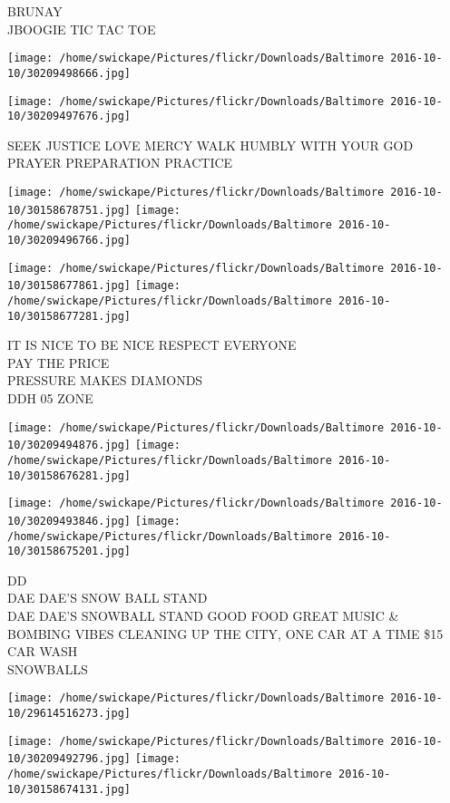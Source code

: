 \documentclass[10pt,letterpaper]{article}
\begin{document}
BRUNAY\\
JBOOGIE TIC TAC TOE
\pagebreak

\texttt{[image: /home/swickape/Pictures/flickr/Downloads/Baltimore 2016-10-10/30209498666.jpg]}

\vspace{0.25in}
\texttt{[image: /home/swickape/Pictures/flickr/Downloads/Baltimore 2016-10-10/30209497676.jpg]}

SEEK JUSTICE LOVE MERCY WALK HUMBLY WITH YOUR GOD\\
PRAYER PREPARATION PRACTICE
\pagebreak

\texttt{[image: /home/swickape/Pictures/flickr/Downloads/Baltimore 2016-10-10/30158678751.jpg]}
\texttt{[image: /home/swickape/Pictures/flickr/Downloads/Baltimore 2016-10-10/30209496766.jpg]}

\texttt{[image: /home/swickape/Pictures/flickr/Downloads/Baltimore 2016-10-10/30158677861.jpg]}
\texttt{[image: /home/swickape/Pictures/flickr/Downloads/Baltimore 2016-10-10/30158677281.jpg]}

IT IS NICE TO BE NICE RESPECT EVERYONE\\
PAY THE PRICE\\
PRESSURE MAKES DIAMONDS\\
DDH 05 ZONE
\pagebreak

\texttt{[image: /home/swickape/Pictures/flickr/Downloads/Baltimore 2016-10-10/30209494876.jpg]}
\texttt{[image: /home/swickape/Pictures/flickr/Downloads/Baltimore 2016-10-10/30158676281.jpg]}

\texttt{[image: /home/swickape/Pictures/flickr/Downloads/Baltimore 2016-10-10/30209493846.jpg]}
\texttt{[image: /home/swickape/Pictures/flickr/Downloads/Baltimore 2016-10-10/30158675201.jpg]}

DD\\
DAE DAE'S SNOW BALL STAND\\
DAE DAE'S SNOWBALL STAND GOOD FOOD GREAT MUSIC \& BOMBING VIBES CLEANING UP THE CITY, ONE CAR AT A TIME \$15 CAR WASH\\
SNOWBALLS
\pagebreak

\texttt{[image: /home/swickape/Pictures/flickr/Downloads/Baltimore 2016-10-10/29614516273.jpg]}

\vspace{0.25in}
\texttt{[image: /home/swickape/Pictures/flickr/Downloads/Baltimore 2016-10-10/30209492796.jpg]}
\texttt{[image: /home/swickape/Pictures/flickr/Downloads/Baltimore 2016-10-10/30158674131.jpg]}
\end{document}
